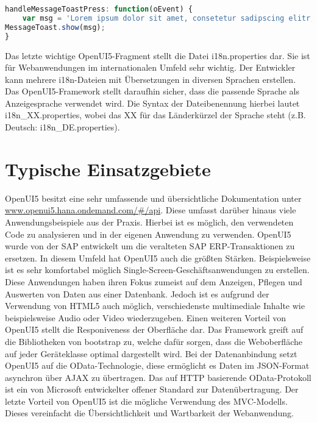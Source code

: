 \begin{lstlisting}[caption=Beispiel OpenUI5 Controller, label=lst:UI5Controller, language=Javascript]
handleMessageToastPress: function(oEvent) {
	var msg = 'Lorem ipsum dolor sit amet, consetetur sadipscing elitr, sed diam nonumy\r\n eirmod.';
MessageToast.show(msg);
}
\end{lstlisting}

Das letzte wichtige OpenUI5-Fragment stellt die Datei i18n.properties dar. Sie ist für Webanwendungen im internationalen Umfeld sehr wichtig. Der Entwickler kann mehrere i18n-Dateien mit Übersetzungen in diversen Sprachen erstellen. Das OpenUI5-Framework stellt daraufhin sicher, dass die passende Sprache als Anzeigesprache verwendet wird. Die Syntax der Dateibenennung hierbei lautet i18n\_XX.properties, wobei das XX für das Länderkürzel der Sprache steht (z.B. Deutsch: i18n\_DE.properties).\autocites[vgl.][126\psqq]{Antolovic2014}


\section{Typische Einsatzgebiete}

OpenUI5 besitzt eine sehr umfassende und übersichtliche Dokumentation unter \url{www.openui5.hana.ondemand.com/#/api}. Diese umfasst darüber hinaus viele Anwendungsbeispiele aus der Praxis. Hierbei ist es möglich, den verwendeten Code zu analysieren und in der eigenen Anwendung zu verwenden. OpenUI5 wurde von der SAP entwickelt um die veralteten SAP ERP-Transaktionen zu ersetzen. In diesem Umfeld hat OpenUI5 auch die größten Stärken. Beispielsweise ist es sehr komfortabel möglich Single-Screen-Geschäftsanwendungen zu erstellen. Diese Anwendungen haben ihren Fokus zumeist auf dem Anzeigen, Pflegen und Auswerten von Daten aus einer Datenbank. Jedoch ist es aufgrund der Verwendung von HTML5 auch möglich, verschiedenste multimediale Inhalte wie beispielsweise Audio oder Video wiederzugeben. Einen weiteren Vorteil von OpenUI5 stellt die Responiveness der Oberfläche dar. Das Framework greift auf die Bibliotheken von bootstrap zu, welche dafür sorgen, dass die Weboberfläche auf jeder Geräteklasse optimal dargestellt wird. Bei der Datenanbindung setzt OpenUI5 auf die OData-Technologie, diese ermöglicht es Daten im JSON-Format asynchron über AJAX zu übertragen. Das auf HTTP basierende OData-Protokoll ist ein von Microsoft entwickelter offener Standard zur Datenübertragung. Der letzte Vorteil von OpenUI5 ist die mögliche Verwendung des MVC-Modells. Dieses vereinfacht die Übersichtlichkeit und Wartbarkeit der Webanwendung. 
